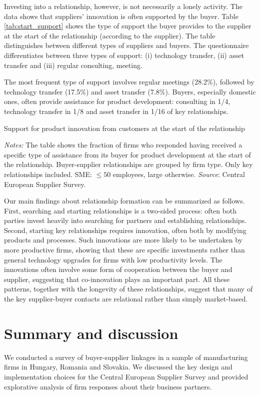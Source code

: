 \documentclass[final, dvipsnames, authoryear,12pt]{elsarticle}
\begin{document}
Investing into a relationship, however, is not necessarily a lonely activity. The data shows that  suppliers' innovation is  often supported by the buyer. Table \ref{tab:start_support} shows the type of support the buyer provides to the supplier at the start of the relationship (according to the supplier). The table distinguishes between different types of suppliers and buyers. The questionnaire differentiates between three types of support: (i) technology transfer, (ii) asset transfer and (iii) regular consulting, meeting.

The most frequent type of support involves regular meetings (28.2\%), followed by technology transfer (17.5\%) and asset transfer (7.8\%). Buyers, especially domestic ones, often provide assistance for product development: consulting in 1/4, technology transfer in 1/8 and asset transfer in 1/16 of key relationships.


\begin{table}[h]
    \caption{Support for product innovation from customers at the start of the relationship}
    \label{tab:start_support}
    

    {\scriptsize \textit{Notes:} The table shows the fraction of firms who responded having received a specific type of assistance from its buyer for product development at the start of the relationship. Buyer-supplier relationships are grouped by firm type. Only key relationships included. SME: $\le 50$ employees, large otherwise. \textit{Source}: Central European Supplier Survey.}
\end{table}

Our main findings about relationship formation can be summarized as follows. First, searching and starting relationships is a two-sided process: often both parties invest heavily into searching for partners and establishing relationships. Second, starting key relationships requires innovation, often both by modifying products and processes. Such innovations are more likely to be undertaken by more productive firms, showing that these are specific investments rather than general technology upgrades for firms with low productivity levels. The innovations often involve some form of cooperation between the buyer and supplier, suggesting that co-innovation plays an important part. All these patterns, together with the longevity of these relationships, suggest that many of the key supplier-buyer contacts are relational rather than simply market-based. 

\section{Summary and discussion}
\label{sec:conclusions}
We conducted a survey of buyer-supplier linkages in a sample of manufacturing firms in Hungary, Romania and Slovakia. We discussed the key design and implementation choices for the Central European Supplier Survey and provided explorative analysis of firm responses about their business partners.
\end{document}
